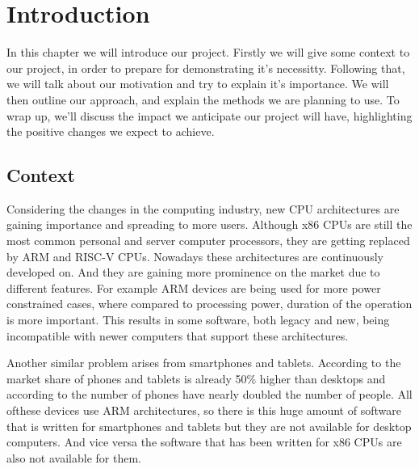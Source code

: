 
\chapter{Introduction}\label{chapter:introduction}
In this chapter we will introduce our project.
Firstly we will give some context to our project, in order to prepare for demonstrating it's necessitty.
Following that, we will talk about our motivation and try to explain it's importance. 
We will then outline our approach, and explain the methods we are planning to use. 
To wrap up, we'll discuss the impact we anticipate our project will have, highlighting the positive changes we expect to achieve.


\section{Context}
Considering the changes in the computing industry, new CPU architectures are gaining importance and spreading to more users.
Although x86 CPUs are still the most common personal and server computer processors, they are getting replaced by ARM and RISC-V CPUs.
Nowadays these architectures are continuously developed on.
And they are gaining more prominence on the market due to different features.
For example ARM devices are being used for more power constrained cases, where compared to processing power, duration of the operation is more important.
This results in some software, both legacy and new, being incompatible with newer computers that support these architectures.

Another similar problem arises from smartphones and tablets.
According to \cite{statscounter} the market share of phones and tablets is already 50\% higher than desktops and according to \cite{radicati} the number of phones have nearly doubled the number of people.
All ofthese devices use ARM architectures, so there is this huge amount of software that is written for smartphones and tablets but they are not available for desktop computers.
And vice versa the software that has been written for x86 CPUs are also not available for them.


